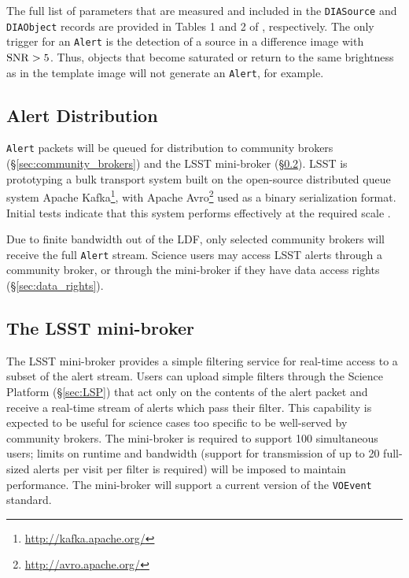 The full list of parameters that are measured and included in the {\tt DIASource} and {\tt DIAObject} records are provided in Tables 1 and 2 of , respectively.
The only trigger for an {\tt Alert} is the detection of a source in a difference image with ${\rm SNR} > 5$. 
Thus, objects that become saturated or return to the same brightness as in the template image will not generate an {\tt Alert}, for example.

\subsection{Alert Distribution} \label{sec:alert_distribution}

\texttt{Alert} packets will be queued for distribution to community brokers (\S \ref{sec:community_brokers}) and the LSST mini-broker (\S \ref{sec:mini-broker}). 
LSST is prototyping  a bulk transport system built on the open-source distributed queue system Apache Kafka\footnote{\url{http://kafka.apache.org/}}, with Apache Avro\footnote{\url{http://avro.apache.org/}} used as a binary serialization format.
Initial tests indicate that this system performs effectively at the required scale .

Due to finite bandwidth out of the LDF, only selected community brokers will receive the full \texttt{Alert} stream.
Science users may access LSST alerts through a community broker, or through the mini-broker if they have data access rights (\S \ref{sec:data_rights}).


\subsection{The LSST mini-broker}\label{sec:mini-broker}

The LSST mini-broker provides a simple filtering service for real-time access to a subset of the alert stream.
Users can upload simple filters through the Science Platform (\S \ref{sec:LSP}) that act only on the contents of the alert packet and receive a real-time stream of alerts which pass their filter.
This capability is expected to be useful for science cases too specific to be well-served by community brokers.
The mini-broker is required to support 100 simultaneous users; limits on runtime and bandwidth (support for transmission of up to 20 full-sized alerts per visit per filter is required) will be imposed to maintain performance.
The mini-broker will support a current version of the \texttt{VOEvent} standard.

